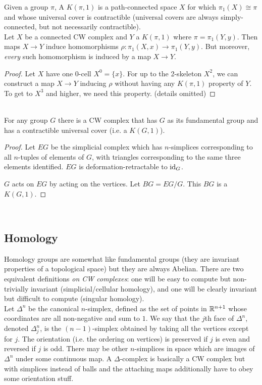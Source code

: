 \documentclass{amsart}
\begin{document}
	 Given a group $\pi$, A $K(\pi,1)$ is a path-connected space $X$ for which $\pi_1(X)\cong \pi$ and whose universal cover is contractible (universal covers are always simply-connected, but not necessarily contractible).\\
	 
	 Let $X$ be a connected CW complex and $Y$ a $K(\pi,1)$ where $\pi = \pi_1(Y,y)$. Then maps $X\to Y$ induce homomorphisms $\rho: \pi_1(X,x)\to \pi_1(Y,y)$. But moreover, \textit{every} such homomorphism is induced by a map $X\to Y$.
	 \begin{proof}
	 	Let $X$ have one $0$-cell $X^0=\{x\}$. For up to the 2-skeleton $X^2$, we can construct a map $X\to Y$ inducing $\rho$ without having any $K(\pi,1)$ property of $Y$. To get to $X^3$ and higher, we need this property. (details omitted)
	 \end{proof}\\
	 
	 For any group $G$ there is a CW complex that has $G$ as its fundamental group and has a contractible universal cover (i.e. a $K(G,1)$).
	 \begin{proof}
	 	Let $EG$ be the simplicial complex which has $n$-simplices corresponding to all $n$-tuples of elements of $G$, with triangles corresponding to the same three elements identified. $EG$ is deformation-retractable to $\operatorname{id}_G$.
	 	
	 	$G$ acts on $EG$ by acting on the vertices. Let $BG=EG/G$. This $BG$ is a $K(G,1)$.
	 \end{proof}\\
	 
	 \subsection{Homology} Homology groups are somewhat like fundamental groups (they are invariant properties of a topological space) but they are always Abelian. There are two equivalent definitions \textit{on CW complexes}: one will be easy to compute but non-trivially invariant (simplicial/cellular homology), and one will be clearly invariant but difficult to compute (singular homology).\\
	 
	 Let $\Delta^n$ be the canonical $n$-simplex, defined as the set of points in $\mathbb{R}^{n+1}$ whose coordinates are all non-negative and sum to $1$. We say that the $j$th face of $\Delta^n$, denoted $\Delta^n_j$, is the $(n-1)$-simplex obtained by taking all the vertices except for $j$. The orientation (i.e. the ordering on vertices) is preserved if $j$ is even and reversed if $j$ is odd. There may be other $n$-simplices in space which are images of $\Delta^n$ under some continuous map. A $\Delta$-complex is basically a CW complex but with simplices instead of balls and the attaching maps additionally have to obey some orientation stuff.\\
	 
\end{document}
